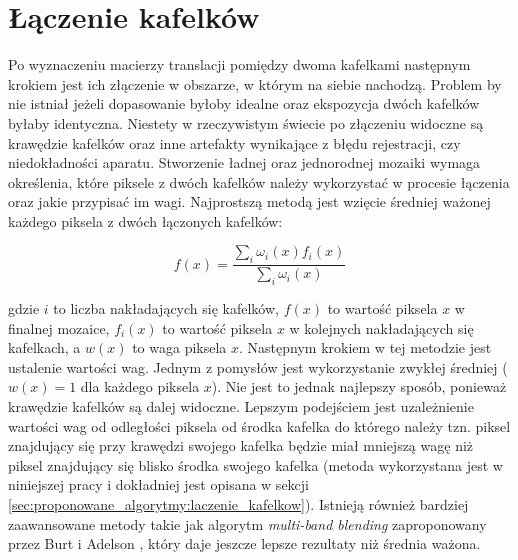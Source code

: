 \section{Łączenie kafelków}
\label{sec:algorytmy_korejestracji:laczenie_kafelkow}

Po wyznaczeniu macierzy translacji pomiędzy dwoma kafelkami następnym krokiem jest ich złączenie w obszarze, w którym na siebie nachodzą. Problem by nie istniał jeżeli dopasowanie byłoby idealne oraz ekspozycja dwóch kafelków byłaby identyczna. Niestety w rzeczywistym świecie po złączeniu widoczne są krawędzie kafelków oraz inne artefakty wynikające z błędu rejestracji, czy niedokładności aparatu. Stworzenie ładnej oraz jednorodnej mozaiki wymaga określenia, które piksele z dwóch kafelków należy wykorzystać w procesie łączenia oraz jakie przypisać im wagi. Najprostszą metodą jest wzięcie średniej ważonej każdego piksela z dwóch łączonych kafelków:

\begin{equation}
f(x)=\frac{\sum_{i}\omega_{i}(x)f_{i}(x)}{\sum_{i}\omega_{i}(x)}
\label{eq:blending}
\end{equation}

gdzie $i$ to liczba nakładających się kafelków, $f(x)$ to wartość piksela $x$ w finalnej mozaice, $f_{i}(x)$ to wartość piksela $x$ w kolejnych nakładających się kafelkach, a $w(x)$ to waga piksela $x$. Następnym krokiem w tej metodzie jest ustalenie wartości wag. Jednym z pomysłów jest wykorzystanie zwykłej średniej ($w(x)=1$ dla każdego piksela $x$). Nie jest to jednak najlepszy sposób, ponieważ krawędzie kafelków są dalej widoczne. Lepszym podejściem jest uzależnienie wartości wag od odległości piksela od środka kafelka do którego należy tzn. piksel znajdujący się przy krawędzi swojego kafelka będzie miał mniejszą wagę niż piksel znajdujący się blisko środka swojego kafelka (metoda wykorzystana jest w niniejszej pracy i dokładniej jest opisana w sekcji \ref{sec:proponowane_algorytmy:laczenie_kafelkow}). Istnieją również bardziej zaawansowane metody takie jak algorytm \textit{multi-band blending} zaproponowany przez Burt i Adelson \cite{Burt:1983:MSA:245.247}, który daje jeszcze lepsze rezultaty \cite{Brown:2007:API:1265138.1265141} niż średnia ważona.

















